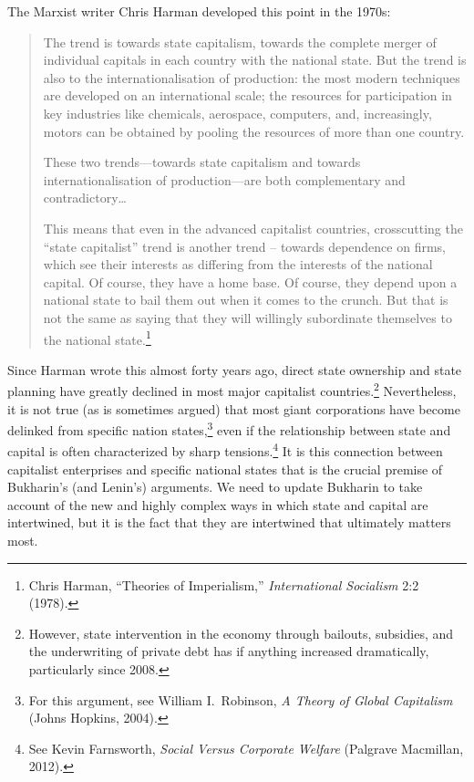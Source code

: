 The Marxist writer Chris Harman developed this point in the 1970s:

\blockquote{The trend is towards state capitalism, towards the complete merger of individual capitals in each country with the national state. But the trend is also to the internationalisation of production: the most modern techniques are developed on an international scale; the resources for participation in key industries like chemicals, aerospace, computers, and, increasingly, motors can be obtained by pooling the resources of more than one country.

These two trends---towards state capitalism and towards internationalisation of production---are both complementary and contradictory\ldots

This means that even in the advanced capitalist countries, crosscutting the ``state capitalist'' trend is another trend -- towards dependence on firms, which see their interests as differing from the interests of the national capital. Of course, they have a home base. Of course, they depend upon a national state to bail them out when it comes to the crunch. But that is not the same as saying that they will willingly subordinate themselves to the national state.\footnote{Chris Harman, ``Theories of Imperialism,'' \emph{International Socialism} 2:2 (1978).}}

Since Harman wrote this almost forty years ago, direct state ownership and state planning have greatly declined in most major capitalist countries.\footnote{However, state intervention in the economy through bailouts, subsidies, and the underwriting of private debt has if anything increased dramatically, particularly since 2008.} Nevertheless, it is not true (as is sometimes argued) that most giant corporations have become delinked from specific nation states,\footnote{For this argument, see William I.\ Robinson, \emph{A Theory of Global Capitalism} (Johns Hopkins, 2004).} even if the relationship between state and capital is often characterized by sharp tensions.\footnote{See Kevin Farnsworth, \emph{Social Versus Corporate Welfare} (Palgrave Macmillan, 2012).} It is this connection between capitalist enterprises and specific national states that is the crucial premise of Bukharin's (and Lenin's) arguments. We need to update Bukharin to take account of the new and highly complex ways in which state and capital are intertwined, but it is the fact that they are intertwined that ultimately matters most.

